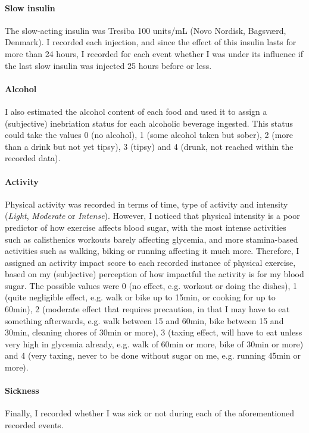 \paragraph{Slow insulin} The slow-acting insulin was Tresiba 100 units/mL (Novo Nordisk, Bagsværd, Denmark). 
I recorded each injection, and since the effect of  this insulin lasts for more than 24 hours, I recorded for each event whether I was under its influence if the last slow insulin was injected 25 hours before or less.

\paragraph{Alcohol} I also estimated the alcohol content of each food and used it to assign a (subjective) inebriation status for each alcoholic beverage ingested.
This status could take the values 0 (no alcohol), 1 (some alcohol taken but sober), 2 (more than a drink but not yet tipsy), 3 (tipsy) and 4 (drunk, not reached within the recorded data).

\paragraph{Activity} Physical activity was recorded in terms of time, type of activity and intensity (\textit{Light}, \textit{Moderate} or \textit{Intense}).
However, I noticed that physical intensity is a poor predictor of how exercise affects blood sugar, with the most intense activities such as calisthenics workouts barely affecting glycemia, and more stamina-based activities such as walking, biking or running affecting it much more.
Therefore, I assigned an activity impact score to each recorded instance of physical exercise, based on my (subjective) perception of how impactful the activity is for my blood sugar.
The possible values were 0 (no effect, e.g. workout or doing the dishes), 1 (quite negligible effect, e.g. walk or bike up to 15min, or cooking for up to 60min), 2 (moderate effect that requires precaution, in that I may have to eat something afterwards, e.g. walk between 15 and 60min, bike between 15 and 30min, cleaning chores of 30min or more), 3 (taxing effect, will have to eat unless very high in glycemia already, e.g. walk of 60min or more, bike of 30min or more) and 4 (very taxing, never to be done without sugar on me, e.g. running 45min or more).

\paragraph{Sickness} Finally, I recorded whether I was sick or not during each of the aforementioned recorded events.

